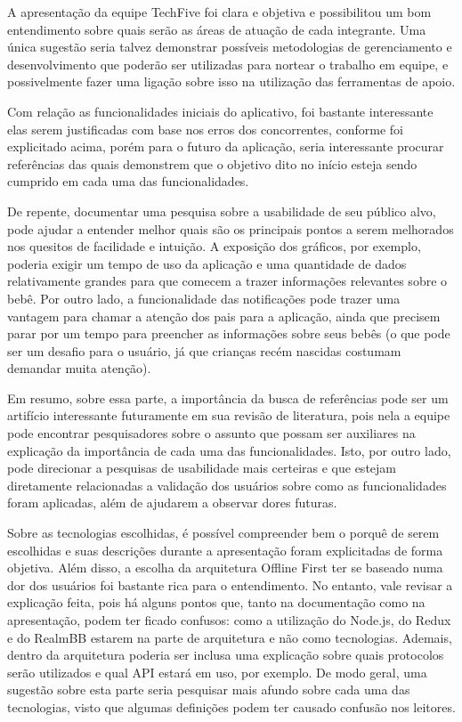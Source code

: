 A apresentação da equipe TechFive foi clara e objetiva e possibilitou um bom entendimento sobre quais serão as áreas de atuação de cada integrante. Uma única sugestão seria talvez demonstrar possíveis metodologias de gerenciamento e desenvolvimento que poderão ser utilizadas para nortear o trabalho em equipe, e possivelmente fazer uma ligação sobre isso na utilização das ferramentas de apoio.

Com relação as funcionalidades iniciais do aplicativo, foi bastante interessante elas serem justificadas com base nos erros dos concorrentes, conforme foi explicitado acima, porém para o futuro da aplicação, seria interessante procurar referências das quais demonstrem que o objetivo dito no início esteja sendo cumprido em cada uma das funcionalidades.

De repente, documentar uma pesquisa sobre a usabilidade de seu público alvo, pode ajudar a entender melhor quais são os principais pontos a serem melhorados nos quesitos de facilidade e intuição. A exposição dos gráficos, por exemplo, poderia exigir um tempo de uso da aplicação e uma quantidade de dados relativamente grandes para que comecem a trazer informações relevantes sobre o bebê. Por outro lado, a funcionalidade das notificações pode trazer uma vantagem para chamar a atenção dos pais para a aplicação, ainda que precisem parar por um tempo para preencher as informações sobre seus bebês (o que pode ser um desafio para o usuário, já que crianças recém nascidas costumam demandar muita atenção). 

Em resumo, sobre essa parte, a importância da busca de referências pode ser um artifício interessante futuramente em sua revisão de literatura, pois nela a equipe pode encontrar pesquisadores sobre o assunto que possam ser auxiliares na explicação da importância de cada uma das funcionalidades. Isto, por outro lado, pode direcionar a pesquisas de usabilidade mais certeiras e que estejam diretamente relacionadas a validação dos usuários sobre como as funcionalidades foram aplicadas, além de ajudarem a observar dores futuras.

Sobre as tecnologias escolhidas, é possível compreender bem o porquê de serem escolhidas e suas descrições durante a apresentação foram explicitadas de forma objetiva. Além disso, a escolha da arquitetura Offline First ter se baseado numa dor dos usuários foi bastante rica para o entendimento. No entanto, vale revisar a explicação feita, pois há alguns pontos que, tanto na documentação como na apresentação, podem ter ficado confusos: como a utilização do Node.js, do Redux e do RealmBB estarem na parte de arquitetura e não como tecnologias. Ademais, dentro da arquitetura poderia ser inclusa uma explicação sobre quais protocolos serão utilizados e qual API estará em uso, por exemplo. De modo geral, uma sugestão sobre esta parte seria pesquisar mais afundo sobre cada uma das tecnologias, visto que algumas definições podem ter causado confusão nos leitores.

